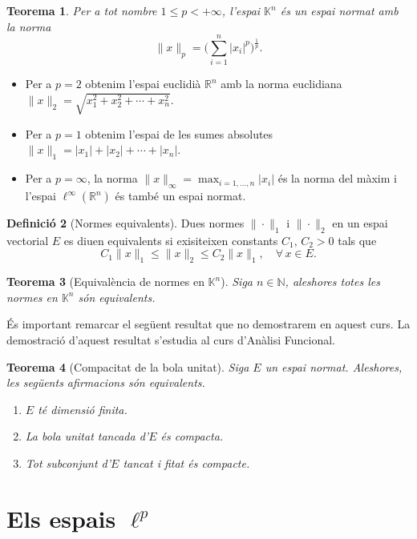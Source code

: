 \documentclass[12pt]{book}
\newtheorem{teorema}{Teorema}[chapter]
\theoremstyle{definition}
\newtheorem{defi}[teorema]{Definició}
\theoremstyle{nota}
\theoremstyle{exemple}
\begin{document}
\begin{teorema}
  Per a tot nombre $1 \leq p < + \infty$, l'espai $\mathbb{K}^n$ és un
  espai normat amb la norma
  \[
    \|x\|_p = \Big( \sum_{i=1}^{n} |x_i|^p \Big)^{\frac{1}{p}}.
  \]
\end{teorema}

\begin{itemize}
\item Per a $p = 2$ obtenim l'espai euclidià $\mathbb{R}^n$ amb la
  norma euclidiana $\|x\|_2 = \sqrt{x_1^2 + x_2^2 + \dotsb + x_n^2}$.
\item Per a $p = 1$ obtenim l'espai de les sumes absolutes
  $\|x\|_1 = |x_1| + |x_2| + \dotsb + |x_n|$.
\item Per a $p = \infty$, la norma
  $\|x\|_\infty = \max_{i=1,\dotsc,n}|x_i|$ és la norma del màxim i
  l'espai $\ell^\infty(\mathbb{R}^n)$ és també un espai normat.
\end{itemize}

\begin{defi}[Normes equivalents]
  Dues normes $\|\cdot\|_1$ i $\|\cdot\|_2$ en un espai vectorial $E$
  es diuen equivalents si exisiteixen constants $C_1,\, C_2 > 0$ tals
  que
  \[
    C_1 \|x\|_1 \leq \|x\|_2 \leq C_2 \|x\|_1, \quad \forall\, x \in E.
  \]
\end{defi}

\begin{teorema}[Equivalència de normes en $\mathbb{K}^n$]
  Siga $n \in \mathbb{N}$, aleshores totes les normes en
  $\mathbb{K}^n$ són equivalents.
\end{teorema}

És important remarcar el següent resultat que no demostrarem en aquest
curs. La demostració d'aquest resultat s'estudia al curs d'Anàlisi
Funcional.

\begin{teorema}[Compacitat de la bola unitat]
  Siga $E$ un espai normat. Aleshores, les següents afirmacions són
  equivalents.
  \begin{enumerate}[nosep]
  \item $E$ té dimensió finita.
  \item La bola unitat tancada d'$E$ és compacta.
  \item Tot subconjunt d'$E$ tancat i fitat és compacte.
  \end{enumerate}
\end{teorema}

\section{Els espais \texorpdfstring{$\ell^p$}{lp}}
\end{document}
